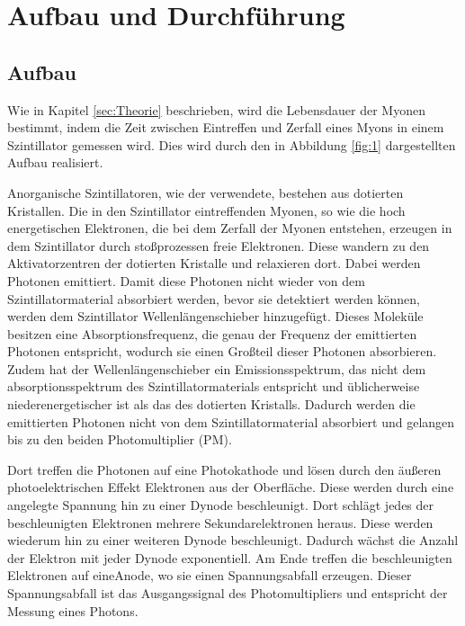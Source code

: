 
\section{Aufbau und Durchführung}
\label{sec:Durchführung}

\subsection{Aufbau}
Wie in Kapitel \ref{sec:Theorie} beschrieben, wird die Lebensdauer der Myonen bestimmt, indem die Zeit zwischen Eintreffen und Zerfall eines Myons in einem Szintillator gemessen wird.
Dies wird durch den in Abbildung \ref{fig:1} dargestellten Aufbau realisiert.

Anorganische Szintillatoren, wie der verwendete, bestehen aus dotierten Kristallen.
Die in den Szintillator eintreffenden Myonen, so wie die hoch energetischen Elektronen, die bei dem Zerfall der Myonen entstehen, erzeugen in dem Szintillator durch stoßprozessen freie Elektronen.
Diese wandern zu den Aktivatorzentren der dotierten Kristalle und relaxieren dort. 
Dabei werden Photonen emittiert.
Damit diese Photonen nicht wieder von dem Szintillatormaterial absorbiert werden, bevor sie detektiert werden können, werden dem Szintillator Wellenlängenschieber hinzugefügt.
Dieses Moleküle besitzen eine Absorptionsfrequenz, die genau der Frequenz der emittierten Photonen entspricht, wodurch sie einen Großteil dieser Photonen absorbieren.
Zudem hat der Wellenlängenschieber ein Emissionsspektrum, das nicht dem absorptionsspektrum des Szintillatormaterials entspricht und üblicherweise niederenergetischer ist als das des dotierten Kristalls.
Dadurch werden die emittierten Photonen nicht von dem Szintillatormaterial absorbiert und gelangen bis zu den beiden Photomultiplier (PM).

Dort treffen die Photonen auf eine Photokathode und lösen durch den äußeren photoelektrischen Effekt Elektronen aus der Oberfläche.
Diese werden durch eine angelegte Spannung hin zu einer Dynode beschleunigt. 
Dort schlägt jedes der beschleunigten Elektronen mehrere Sekundarelektronen heraus. 
Diese werden wiederum hin zu einer weiteren Dynode beschleunigt.
Dadurch wächst die Anzahl der Elektron mit jeder Dynode exponentiell.
Am Ende treffen die beschleunigten Elektronen auf eineAnode, wo sie einen Spannungsabfall erzeugen.
Dieser Spannungsabfall ist das Ausgangssignal des Photomultipliers und entspricht der Messung eines Photons.

